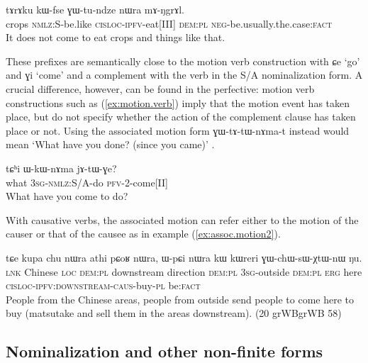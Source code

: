 \documentclass[oldfontcommands,oneside,a4paper,11pt]{article}
\newcommand{\ipa}[1]{{\phon#1}} %
\newcommand{\refb}[1]{(\ref{#1})}
\newcommand{\factual}[1]{\textsc{:fact}}
\begin{document}
\begin{exe}
\ex \label{ex:cisloc}
\gll
\ipa{tɤrɤku} 	\ipa{kɯ-fse} 	\ipa{ɣɯ-tu-ndze} 	\ipa{nɯra} 	\ipa{mɤ-ŋgrɤl.} \\
crops \textsc{nmlz}:S-be.like \textsc{cisloc-ipfv}-eat[III] \textsc{dem:pl} \textsc{neg-}be.usually.the.case\factual{} \\
\glt It does not come to eat crops and things like that.
\end{exe}

These prefixes are semantically close to the motion verb construction with \ipa{ɕe} `go' and \ipa{ɣi} `come' and a complement with the verb in the S/A nominalization form. A crucial difference, however, can be found in the perfective:  motion verb constructions such as \refb{ex:motion.verb} imply that the motion event has taken place, but do not specify whether the action of the complement clause has taken place or not. Using the associated motion form \ipa{ɣɯ-tɤ-tɯ-nɤma-t} instead would mean `What have you done? (since you came)' .

\begin{exe}
\ex \label{ex:motion.verb}
\gll
\ipa{tɕʰi} 	\ipa{ɯ-kɯ-nɤma} 	\ipa{jɤ-tɯ-ɣe?} \\
what \textsc{3sg-nmlz:}S/A-do \textsc{pfv-2}-come[II] \\
\glt What have you come to do?
\end{exe}


With causative verbs, the associated motion can refer either to the motion of the causer or that of the causee as in example \refb{ex:assoc.motion2}.

  \begin{exe}
\ex \label{ex:assoc.motion2}
\gll
\ipa{tɕe} 	\ipa{kupa} 	\ipa{chu} 	\ipa{nɯra} 	\ipa{athi} 	\ipa{pɕoʁ} 	\ipa{nɯra,} 	\ipa{ɯ-pɕi} 	\ipa{nɯra} 	\ipa{kɯ} 	\ipa{kɯreri} 	\ipa{ɣɯ-chɯ-sɯ-χtɯ-nɯ} 	\ipa{ŋu.}  \\
\textsc{lnk} Chinese \textsc{loc} \textsc{dem:pl} downstream direction \textsc{dem:pl} \textsc{3sg}-outside  \textsc{dem:pl}  \textsc{erg} here \textsc{cisloc-ipfv:downstream-caus}-buy-\textsc{pl} be\factual{} \\
\glt People from the Chinese areas, people from outside send people to come here to buy (matsutake and sell them in the areas downstream). (20 grWBgrWB 58)
  \end{exe} 


\subsection{Nominalization and other non-finite forms}
\end{document}
